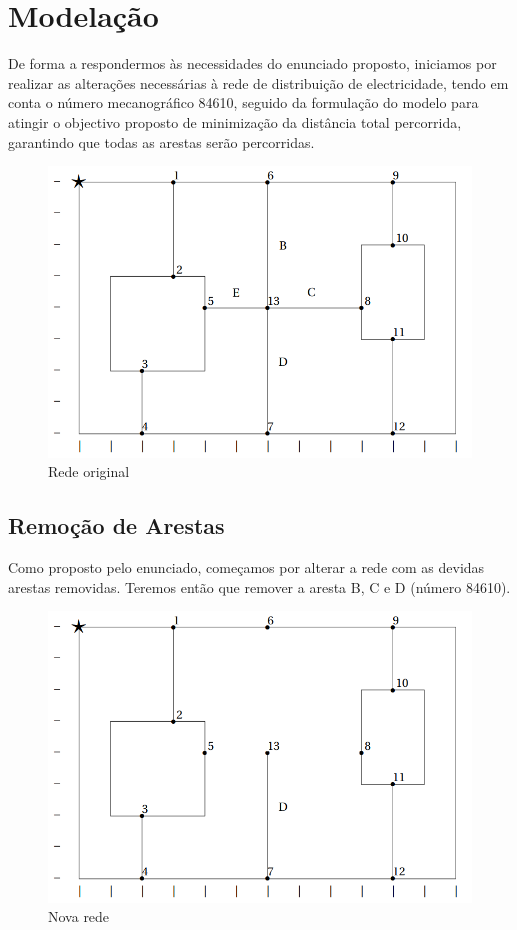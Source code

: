 \chapter{Modelação}
De forma a respondermos às necessidades do enunciado proposto, iniciamos por realizar as alterações necessárias à rede de distribuição de electricidade, tendo em conta o número mecanográfico 84610, seguido da formulação do modelo para atingir o objectivo proposto de minimização da distância total percorrida, garantindo que todas as arestas serão percorridas.
\begin{figure}[h!]
\centering
\includegraphics[width=.85\textwidth]{images/main/redeOriginal.png}
\caption{Rede original}
\end{figure}
\newpage
\section{Remoção de Arestas}
Como proposto pelo enunciado, começamos por alterar a rede com as devidas arestas removidas. Teremos então que remover a aresta B, C e D (número 84610).

\begin{figure}[h!]
\centering
\includegraphics[width=.85\textwidth]{images/main/novaRede.png}
\caption{Nova rede}
\end{figure}

